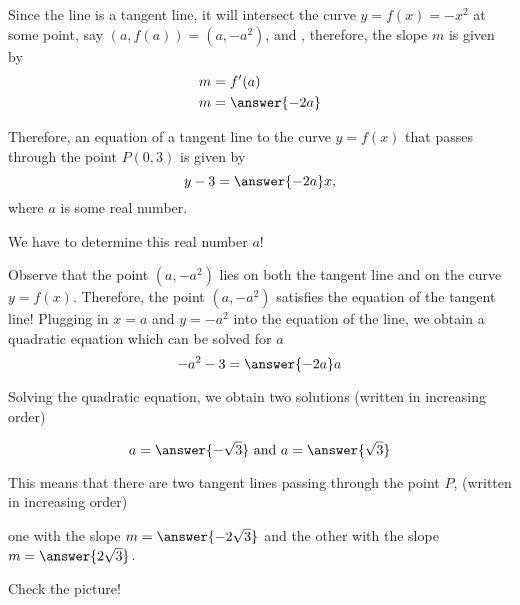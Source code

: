 \documentclass{ximera}
\begin{document}
\begin{exercise}
\begin{image}
\end{image}
 Since the line is a tangent line, it will intersect the curve $y=f(x)=-x^2$ at some point, say $(a,f(a))=(a,-a^2)$, and , therefore, the slope $m$ is given by
\begin{align*}
m &=f'(a)\\
 m&= \answer{-2a}\\
\end{align*}



Therefore, an equation of a tangent line to the curve $y=f(x)$ that passes through the point $P(0,3)$ is given by
\[
y-3=\answer{-2a}x,
\]
where $a$ is some real number.

We have to determine this real number $a$!

Observe that the point $(a,-a^2)$ lies on both the tangent line and on the curve $y=f(x)$. Therefore, the point $(a,-a^2)$ satisfies the equation of the tangent line!
Plugging in $x=a$ and $y=-a^2$ into the equation of the line, we obtain a quadratic equation which can be solved for $a$
\[
-a^2-3=\answer{-2a}a
\]



Solving the quadratic equation, we obtain  two solutions (written in increasing order)


\[
a=\answer{-\sqrt{3}}\text {   and    } a=\answer{\sqrt{3}}
\]

This means  that there are two tangent lines passing through the point $P$, (written in increasing order)

 one with the slope $m=\answer{-2\sqrt{3}}$ and the other with the slope $m=\answer{2\sqrt{3}}$.
 
Check the picture!
\begin{image}
\end{image}
\end{exercise}
\end{document}
